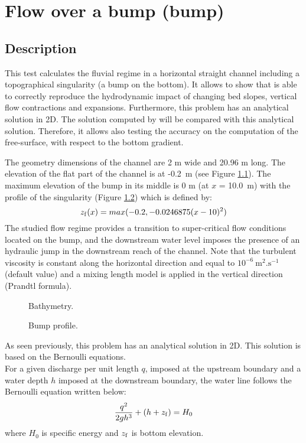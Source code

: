 \chapter{Flow over a bump (bump)}

\section{Description}
\bigskip
This test calculates the fluvial regime in a horizontal straight channel
including a topographical singularity (a bump on the bottom). 
It allows to show that  is able to correctly reproduce the hydrodynamic 
impact of changing bed slopes, vertical flow contractions and expansions.
Furthermore, this problem has an analytical solution in 2D. 
The solution computed by  will be compared with this analytical 
solution. Therefore, it allows also testing the accuracy on the computation of the
free-surface, with respect to the bottom gradient. 

\bigskip
The geometry dimensions of the channel are 2 m wide and 20.96 m long. 
The elevation of the flat part of the channel is at -0.2~m 
(see Figure \ref{t3d:bump:fig:bathy}).
The maximum elevation of the bump in its middle is 0 m (at $x$ = 10.0~m) 
with the profile of the singularity (Figure \ref{t3d:bump:fig:profil}) 
which is defined by:
\begin{equation*}
z_{\rm{f}}(x) =max(-0.2, -0.0246875(x-10)^2)
\end{equation*}
The studied flow regime provides a transition to super-critical flow conditions 
located on the bump,
and the downstream water level imposes the presence of an hydraulic jump 
in the downstream reach of the channel.
Note that the turbulent viscosity is constant along the horizontal direction
and equal to $10^{-6}~\text{m}^2.\text{s}^{-1}$ (default value) and a mixing
length model is applied in the vertical direction (Prandtl formula).

\begin{figure}[!htbp]
 \centering
 \caption{Bathymetry.}
 \label{t3d:bump:fig:bathy}
\end{figure}
\begin{figure}[!htbp]
 \centering
 \caption{Bump profile.}
 \label{t3d:bump:fig:profil}
\end{figure}

\bigskip
As seen previously, this problem has an analytical solution in 2D. 
This solution is based on the Bernoulli equations.\\
For a given discharge per unit length $q$, imposed at the upstream
boundary and a water depth $h$ imposed at the downstream boundary,
the water line follows the Bernoulli equation written below:
\begin{equation*}
\frac{q^2}{2gh^3}+ (h + z_{\rm{f}}) = H_0
\end{equation*}
where $H_0$ is specific energy and $z_{\rm{f}}$ is bottom elevation.


